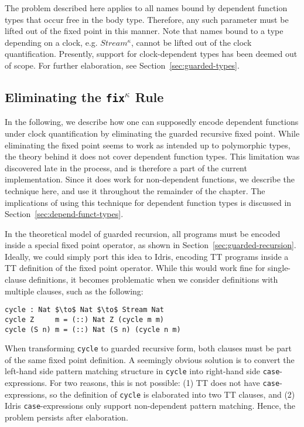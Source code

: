 The problem described here applies to all names bound by dependent function
types that occur free in the body type. Therefore, any such parameter must be
lifted out of the fixed point in this manner. Note that names bound to a type
depending on a clock, e.g. $Stream^{\kappa}$, cannot be lifted out of the clock
quantification. Presently, support for clock-dependent types has been deemed out
of scope. For further elaboration, see Section~\ref{sec:guarded-types}.

\subsection{Eliminating the \texttt{fix$^\kappa$} Rule}
\label{sec:fixkappa-rule}
In the following, we describe how one can supposedly encode dependent functions
under clock quantification by eliminating the guarded recursive fixed
point. While eliminating the fixed point seems to work as intended up to polymorphic
types, the theory behind it does not cover dependent function types. This
limitation was discovered late in the process, and is therefore a part of the
current implementation. Since it does work for non-dependent functions, we
describe the technique here, and use it throughout the remainder of the
chapter. The implications of using this technique for dependent function types
is discussed in Section~\ref{sec:depend-funct-types}.

In the theoretical model of guarded recursion, all programs must be encoded
inside a special fixed point operator, as shown in
Section~\ref{sec:guarded-recursion}. Ideally, we could simply port this idea to
Idris, encoding TT programs inside a TT definition of the fixed point
operator. While this would work fine for single-clause definitions, it becomes
problematic when we consider definitions with multiple clauses, such as the
following: 

\begin{lstlisting}[mathescape,title=\ttBlock]
cycle : Nat $\to$ Nat $\to$ Stream Nat
cycle Z     m = (::) Nat Z (cycle m m)
cycle (S n) m = (::) Nat (S n) (cycle n m)
\end{lstlisting}

When transforming \texttt{cycle} to guarded recursive form, both clauses must be
part of the same fixed point definition. A seemingly obvious solution is to
convert the left-hand side pattern matching structure in \texttt{cycle} into
right-hand side \texttt{case}-expressions. For two reasons, this is not
possible: (1) TT does not have \texttt{case}-expressions, so the definition of
\texttt{cycle} is elaborated into two TT clauses, and (2) Idris
\texttt{case}-expressions only support non-dependent pattern matching. Hence,
the problem persists after elaboration.

